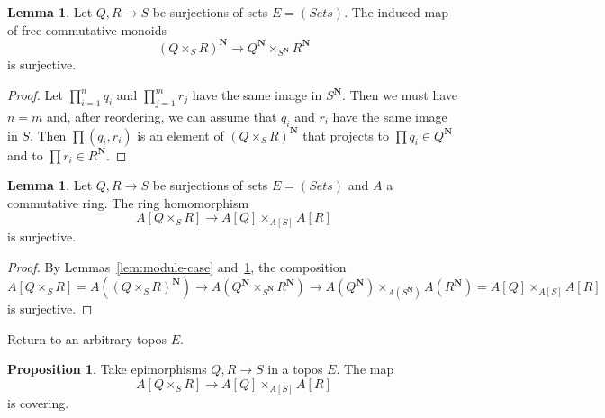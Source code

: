 \documentclass[11pt,reqno]{amsart}
\theoremstyle{definition}
\newtheorem{lemma}[theorem]{Lemma}
\newtheorem{proposition}[theorem]{Proposition}
\begin{document}
\begin{lemma} \label{lem:monoid-case}
	Let $Q, R \to S$ be surjections of sets $E = (Sets)$.  The induced map of free commutative monoids 
	\[(Q \mathop\times_S R)^{\mathbf N} \to Q^{\mathbf N} \mathop\times_{S^{\mathbf N}} R^{\mathbf N}\]
	is surjective.
\end{lemma}
\begin{proof}
Let $\prod_{i = 1}^n q_i$ and $\prod_{j=1}^m r_j$ have the same image in $S^{\mathbf N}$.  Then we must have $n = m$ and, after reordering, we can assume that $q_i$ and $r_i$ have the same image in $S$.  Then $\prod (q_i, r_i)$ is an element of $(Q \mathop\times_S R)^{\mathbf N}$ that projects to $\prod q_i \in Q^{\mathbf N}$ and to $\prod r_i \in R^{\mathbf N}$.
\end{proof}




\begin{lemma} \label{lem:ring-case}
	Let $Q, R \to S$ be surjections of sets $E = (Sets)$ and $A$ a commutative ring.  The ring homomorphism
	\begin{equation*}
		A[Q \mathop\times_S R] \to A[Q] \mathop\times_{A[S]} A[R]
	\end{equation*}
	is surjective.
\end{lemma}
\begin{proof} 
	By Lemmas~\ref{lem:module-case} and~\ref{lem:monoid-case}, the composition
	\begin{equation*}
		A[Q \mathop\times_S R] = A((Q \mathop\times_S R)^{\mathbf N}) \to A(Q^{\mathbf N} \mathop\times_{S^{\mathbf N}} R^{\mathbf N}) \to A(Q^{\mathbf N}) \mathop\times_{A (S^{\mathbf N})} A(R^{\mathbf N}) = A[Q] \mathop\times_{A[S]} A[R]
	\end{equation*}
	is surjective.
\end{proof}

Return to an arbitrary topos $E$. 


\begin{proposition}\label{coveringfreeproduct}
	Take epimorphisms $Q, R \to S$ in a topos $E$.  The map 
	\begin{equation} \label{eqn:1}
A[Q \times_S R] \to A[Q] \times_{A[S]} A[R]
	\end{equation}
is covering. 

\end{proposition}
\end{document}
